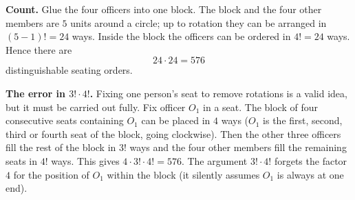\textbf{Count.} Glue the four officers into one block. The block and the four other members are $5$ units around a circle; up to rotation they can be arranged in $(5-1)!=24$ ways. Inside the block the officers can be ordered in $4!=24$ ways. Hence there are
\[
24\cdot24=\boxed{576}
\]
distinguishable seating orders.

\textbf{The error in $3!\cdot4!$.} Fixing one person's seat to remove rotations is a valid idea, but it must be carried out fully. Fix officer $O_1$ in a seat. The block of four consecutive seats containing $O_1$ can be placed in $4$ ways ($O_1$ is the first, second, third or fourth seat of the block, going clockwise). Then the other three officers fill the rest of the block in $3!$ ways and the four other members fill the remaining seats in $4!$ ways. This gives $4\cdot3!\cdot4!=576$. The argument $3!\cdot4!$ forgets the factor $4$ for the position of $O_1$ within the block (it silently assumes $O_1$ is always at one end).
